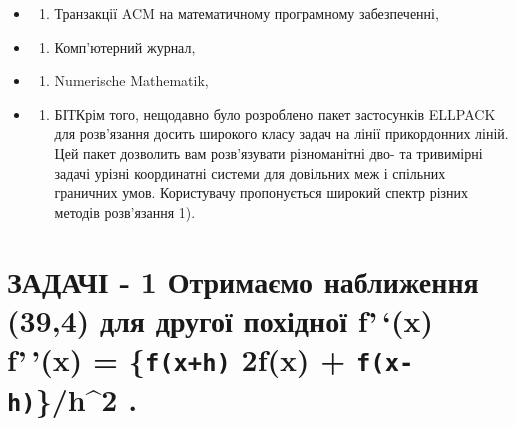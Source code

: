 \documentclass[
  ukrainian,
]{article}
\providecommand{\tightlist}{%
  \setlength{\itemsep}{0pt}\setlength{\parskip}{0pt}}
\begin{document}
\begin{itemize}
\tightlist
\item
  \begin{enumerate}
  \def\labelenumi{\alph{enumi})}
  \tightlist
  \item
    Транзакції ACM на математичному програмному забезпеченні,
  \end{enumerate}
\item
  \begin{enumerate}
  \def\labelenumi{\arabic{enumi})}
  \setcounter{enumi}{5}
  \tightlist
  \item
    Комп'ютерний журнал,
  \end{enumerate}
\item
  \begin{enumerate}
  \def\labelenumi{\Alph{enumi})}
  \setcounter{enumi}{1}
  \tightlist
  \item
    Numerische Mathematik,
  \end{enumerate}
\item
  \begin{enumerate}
  \def\labelenumi{\alph{enumi})}
  \setcounter{enumi}{17}
  \tightlist
  \item
    БІТКрім того, нещодавно було розроблено пакет застосунків ELLPACK
    для розв'язання досить широкого класу задач на лінії прикордонних
    ліній. Цей пакет дозволить вам розв'язувати різноманітні дво- та
    тривимірні задачі урізні координатні системи для довільних меж і
    спільних граничних умов. Користувачу пропонується широкий спектр
    різних методів розв'язання 1).
  \end{enumerate}
\end{itemize}

\section{\texorpdfstring{ЗАДАЧІ - 1 Отримаємо наближення (39,4) для
другої похідної f'\,`(x) f'\,'(x) = \{\texttt{f(x+h)} 2f(x) +
\texttt{f(x-h)}\}/h\^{}2
.}{ЗАДАЧІ - 1 Отримаємо наближення (39,4) для другої похідної f'\,`(x) f'\,'(x) = \{f(x+h) 2f(x) + f(x-h)\}/h\^{}2 .}}\label{ux437ux430ux434ux430ux447ux456---1-ux43eux442ux440ux438ux43cux430ux454ux43cux43e-ux43dux430ux431ux43bux438ux436ux435ux43dux43dux44f-394-ux434ux43bux44f-ux434ux440ux443ux433ux43eux457-ux43fux43eux445ux456ux434ux43dux43eux457-fx-fx-fxh-2fx-fx-hh2-.}
\end{document}
